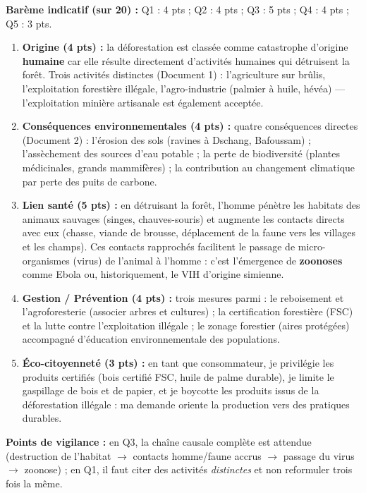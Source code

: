 \documentclass[11pt]{article}
\begin{document}
\begin{corrige}
\textbf{Barème indicatif (sur 20) :} Q1 : 4 pts ; Q2 : 4 pts ; Q3 : 5 pts ; Q4 : 4 pts ; Q5 : 3 pts.

\begin{enumerate}
\item \textbf{Origine (4 pts) :} la déforestation est classée comme catastrophe d'origine \textbf{humaine} car elle résulte directement d'activités humaines qui détruisent la forêt. Trois activités distinctes (Document 1) : l'agriculture sur brûlis, l'exploitation forestière illégale, l'agro-industrie (palmier à huile, hévéa) — l'exploitation minière artisanale est également acceptée.
\item \textbf{Conséquences environnementales (4 pts) :} quatre conséquences directes (Document 2) : l'érosion des sols (ravines à Dschang, Bafoussam) ; l'assèchement des sources d'eau potable ; la perte de biodiversité (plantes médicinales, grands mammifères) ; la contribution au changement climatique par perte des puits de carbone.
\item \textbf{Lien santé (5 pts) :} en détruisant la forêt, l'homme pénètre les habitats des animaux sauvages (singes, chauves-souris) et augmente les contacts directs avec eux (chasse, viande de brousse, déplacement de la faune vers les villages et les champs). Ces contacts rapprochés facilitent le passage de micro-organismes (virus) de l'animal à l'homme : c'est l'émergence de \textbf{zoonoses} comme Ebola ou, historiquement, le VIH d'origine simienne.
\item \textbf{Gestion / Prévention (4 pts) :} trois mesures parmi : le reboisement et l'agroforesterie (associer arbres et cultures) ; la certification forestière (FSC) et la lutte contre l'exploitation illégale ; le zonage forestier (aires protégées) accompagné d'éducation environnementale des populations.
\item \textbf{Éco-citoyenneté (3 pts) :} en tant que consommateur, je privilégie les produits certifiés (bois certifié FSC, huile de palme durable), je limite le gaspillage de bois et de papier, et je boycotte les produits issus de la déforestation illégale : ma demande oriente la production vers des pratiques durables.
\end{enumerate}
\textbf{Points de vigilance :} en Q3, la chaîne causale complète est attendue (destruction de l'habitat $\rightarrow$ contacts homme/faune accrus $\rightarrow$ passage du virus $\rightarrow$ zoonose) ; en Q1, il faut citer des activités \emph{distinctes} et non reformuler trois fois la même.
\end{corrige}
\end{document}
